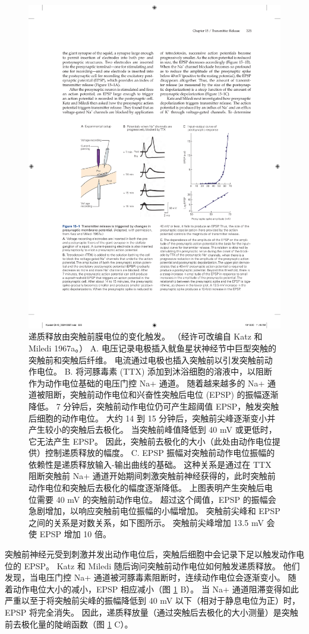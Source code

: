 \begin{figure}[htbp]
	\centering
	\includegraphics[width=0.8\linewidth]{chap15/fig_15_1}
	\caption{递质释放由突触前膜电位的变化触发。 （经许可改编自 Katz 和 Miledi 1967a。） A. 电压记录电极插入鱿鱼星状神经节中巨型突触的突触前和突触后纤维。 电流通过电极也插入突触前以引发突触前动作电位。 B. 将河豚毒素 (TTX) 添加到沐浴细胞的溶液中，以阻断作为动作电位基础的电压门控 Na+ 通道。 随着越来越多的 Na+ 通道被阻断，突触前动作电位和兴奋性突触后电位 (EPSP) 的振幅逐渐降低。 7 分钟后，突触前动作电位仍可产生超阈值 EPSP，触发突触后细胞的动作电位。 大约 14 到 15 分钟后，突触前尖峰逐渐变小并产生较小的突触后去极化。 当突触前峰值降低到 40 mV 或更低时，它无法产生 EPSP。 因此，突触前去极化的大小（此处由动作电位提供）控制递质释放的幅度。 C. EPSP 振幅对突触前动作电位振幅的依赖性是递质释放输入-输出曲线的基础。 这种关系是通过在 TTX 阻断突触前 Na+ 通道开始期间刺激突触前神经获得的，此时突触前动作电位和突触后去极化的幅度逐渐降低。 上图表明产生突触后电位需要 40 mV 的突触前动作电位。 超过这个阈值，EPSP 的振幅会急剧增加，以响应突触前电位振幅的小幅增加。 突触前尖峰和 EPSP 之间的关系是对数关系，如下图所示。 突触前尖峰增加 13.5 mV 会使 EPSP 增加 10 倍。}
	\label{fig:15_1}
\end{figure}


突触前神经元受到刺激并发出动作电位后，突触后细胞中会记录下足以触发动作电位的 EPSP。 
Katz 和 Miledi 随后询问突触前动作电位如何触发递质释放。 
他们发现，当电压门控 Na+ 通道被河豚毒素阻断时，连续动作电位会逐渐变小。 
随着动作电位大小的减小，EPSP 相应减小（图 \ref{fig:15_1} B）。 
当 Na+ 通道阻滞变得如此严重以至于将突触前尖峰的振幅降低到 40 mV 以下（相对于静息电位为正）时，EPSP 将完全消失。 
因此，递质释放量（通过突触后去极化的大小测量）是突触前去极化量的陡峭函数（图 \ref{fig:15_1} C）。


